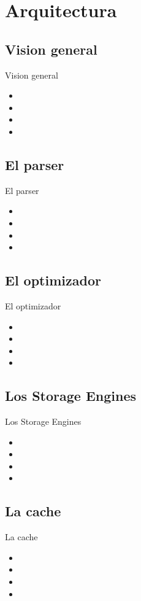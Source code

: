\section{Arquitectura}

\subsection{Vision general}
\begin{frame}{Vision general}
  \begin{itemize}
    \item 
    \item 
    \item 
    \item 
  \end{itemize}
\end{frame}

\subsection{El parser}
\begin{frame}{El parser}
  \begin{itemize}
    \item 
    \item 
    \item 
    \item 
  \end{itemize}
\end{frame}

\subsection{El optimizador}
\begin{frame}{El optimizador}
  \begin{itemize}
    \item 
    \item 
    \item 
    \item 
  \end{itemize}
\end{frame}

\subsection{Los Storage Engines}
\begin{frame}{Los Storage Engines}
  \begin{itemize}
    \item 
    \item 
    \item 
    \item 
  \end{itemize}
\end{frame}

\subsection{La cache}
\begin{frame}{La cache}
  \begin{itemize}
    \item 
    \item 
    \item 
    \item 
  \end{itemize}
\end{frame}
